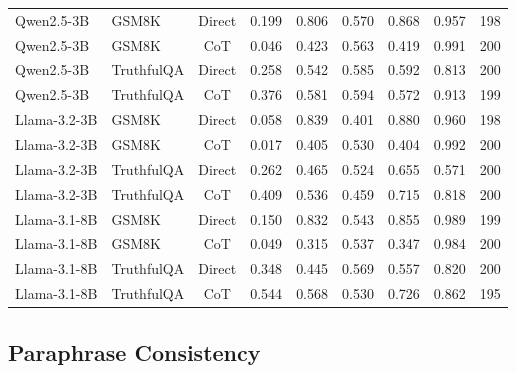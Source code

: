 \documentclass{article}
\begin{document}
\begin{footnotesize}
\begin{longtable}{llcrrrrrr}
Qwen2.5-3B & GSM8K & Direct & 0.199 & 0.806 & 0.570 & 0.868 & 0.957 & 198 \\
Qwen2.5-3B & GSM8K & CoT & 0.046 & 0.423 & 0.563 & 0.419 & 0.991 & 200 \\
Qwen2.5-3B & TruthfulQA & Direct & 0.258 & 0.542 & 0.585 & 0.592 & 0.813 & 200 \\
Qwen2.5-3B & TruthfulQA & CoT & 0.376 & 0.581 & 0.594 & 0.572 & 0.913 & 199 \\
Llama-3.2-3B & GSM8K & Direct & 0.058 & 0.839 & 0.401 & 0.880 & 0.960 & 198 \\
Llama-3.2-3B & GSM8K & CoT & 0.017 & 0.405 & 0.530 & 0.404 & 0.992 & 200 \\
Llama-3.2-3B & TruthfulQA & Direct & 0.262 & 0.465 & 0.524 & 0.655 & 0.571 & 200 \\
Llama-3.2-3B & TruthfulQA & CoT & 0.409 & 0.536 & 0.459 & 0.715 & 0.818 & 200 \\
Llama-3.1-8B & GSM8K & Direct & 0.150 & 0.832 & 0.543 & 0.855 & 0.989 & 199 \\
Llama-3.1-8B & GSM8K & CoT & 0.049 & 0.315 & 0.537 & 0.347 & 0.984 & 200 \\
Llama-3.1-8B & TruthfulQA & Direct & 0.348 & 0.445 & 0.569 & 0.557 & 0.820 & 200 \\
Llama-3.1-8B & TruthfulQA & CoT & 0.544 & 0.568 & 0.530 & 0.726 & 0.862 & 195 \\
\end{longtable}
\end{footnotesize}

\subsection{Paraphrase Consistency}
\end{document}
